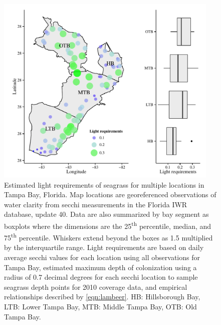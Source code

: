 \documentclass[letterpaper,12pt,oneside]{article}\usepackage[]{graphicx}\usepackage[]{color}
\begin{document}
\begin{figure}
\centering
\includegraphics[width = 0.95\textwidth]{figs/light_tb.pdf}
\caption{Estimated light requirements of seagrass for multiple locations in Tampa Bay, Florida.  Map locations are georeferenced observations of water clarity from secchi measurements in the Florida \acl{IWR} database, update 40.  Data are also summarized by bay segment as boxplots where the dimensions are the 25\textsuperscript{th} percentile, median, and 75\textsuperscript{th} percentile.  Whiskers extend beyond the boxes as 1.5 multiplied by the interquartile range.  Light requirements are based on daily average secchi values for each location using all observations for Tampa Bay, estimated maximum depth of colonization using a radius of 0.7 decimal degrees for each secchi location to sample seagrass depth points for 2010 coverage data, and empirical relationships described by \cref{eqn:lambeer}. HB: Hillsborough Bay, LTB: Lower Tampa Bay, MTB: Middle Tampa Bay, OTB: Old Tampa Bay.}
\label{fig:light_tb}
\end{figure}

\end{document}
